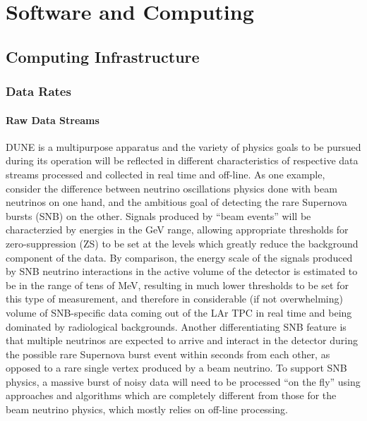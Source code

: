 \chapter{Software and Computing}
\label{ch:detectors-sc}

\section{Computing Infrastructure}
\label{sec:detectors-sc-infrastructure}

\subsection{Data Rates}
\label{sec:detectors-sc-infrastructure-data-rates}


\subsubsection{Raw Data Streams}
DUNE is a multipurpose apparatus and the variety of physics goals to be pursued during its operation will
be reflected in different characteristics of respective data streams processed and collected in real time and off-line.
As one example, consider the difference between neutrino oscillations physics done with beam neutrinos on one hand,
and the ambitious goal of detecting the rare Supernova bursts (SNB) on the other. Signals produced by ``beam events'' will
be characterzied by energies in the GeV range, allowing appropriate thresholds for zero-suppression (ZS) to be
set at the levels which greatly reduce the background component of the data. By comparison, the energy scale of
the signals produced by SNB neutrino interactions in the active volume of the detector is estimated to be in the range of tens of MeV, resulting
in much lower thresholds to be set for this type of measurement, and therefore in considerable (if not overwhelming) volume of SNB-specific data coming
out of the LAr TPC in real time and being dominated by radiological backgrounds. Another differentiating SNB feature is that multiple neutrinos are expected
to arrive and interact in the detector during the possible rare Supernova burst event within seconds from each other, as opposed to a rare single vertex produced by a beam neutrino.
To support SNB physics, a massive burst of noisy data will need to be processed ``on the fly'' using approaches and
algorithms which are completely  different from those for the beam neutrino physics, which mostly relies on off-line processing.

